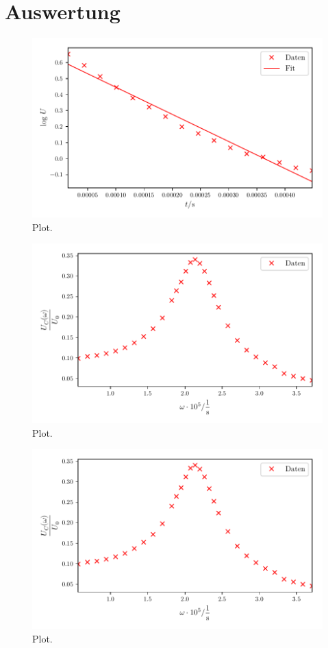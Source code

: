 \section{Auswertung}
\label{sec:Auswertung}





\begin{figure}
  \centering
  \includegraphics{build/plota.pdf}
  \caption{Plot.}
  \label{fig:plota}
\end{figure}






\begin{figure}
  \centering
  \includegraphics{build/plotc.pdf}
  \caption{Plot.}
  \label{fig:plotc}
\end{figure}




\begin{figure}
  \centering
  \includegraphics{build/plotc.pdf}
  \caption{Plot.}
  \label{fig:plotd}
\end{figure}

